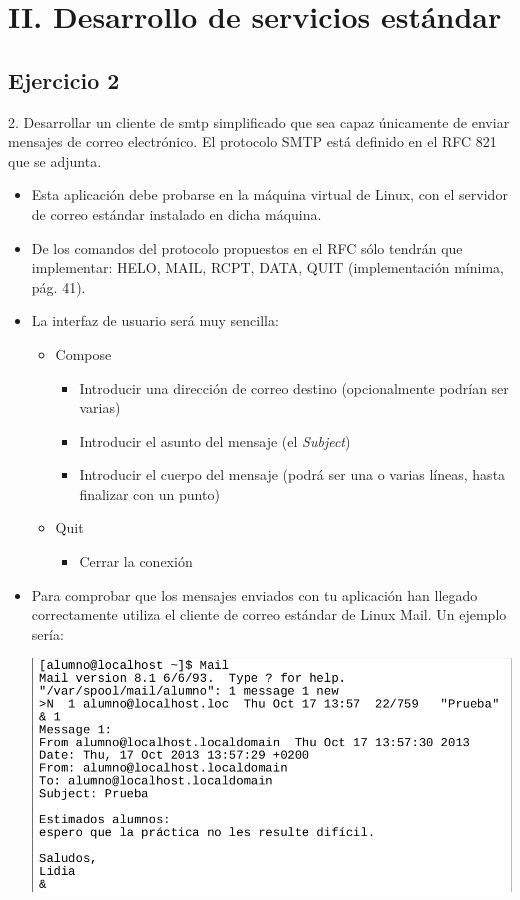 \documentclass{article}
\begin{document}
\section{II. Desarrollo de servicios estándar}

\subsection{Ejercicio 2}

2. Desarrollar un cliente de smtp simplificado que sea capaz únicamente de enviar mensajes
de correo electrónico. El protocolo SMTP está definido en el RFC 821 que se adjunta.
\begin{itemize}
\item Esta aplicación debe probarse en la máquina virtual de Linux, con el servidor de correo
estándar instalado en dicha máquina.
\item De los comandos del protocolo propuestos en el RFC sólo tendrán que implementar:
HELO, MAIL, RCPT, DATA, QUIT (implementación mínima, pág. 41).
\item La interfaz de usuario será muy sencilla:
\begin{itemize}
\item Compose
\begin{itemize}
\item Introducir una dirección de correo destino (opcionalmente podrían ser
varias)
\item Introducir el asunto del mensaje (el \textit{Subject})
\item Introducir el cuerpo del mensaje (podrá ser una o varias líneas, hasta
finalizar con un punto)
\end{itemize}
\item Quit
\begin{itemize}
\item Cerrar la conexión
\end{itemize}
\end{itemize}
\item Para comprobar que los mensajes enviados con tu aplicación han llegado
correctamente utiliza el cliente de correo estándar de Linux Mail. Un ejemplo sería:
\begin{center}
\includegraphics[scale=0.4]{images/ej.png}

\end{center}
\end{itemize}
\end{document}
